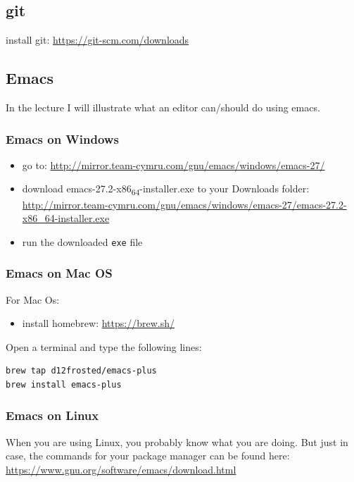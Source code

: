 \documentclass[11pt]{article}
\begin{document}
\subsection{git}
\label{sec:orged07eba}

install git: \url{https://git-scm.com/downloads}

\subsection{Emacs}
\label{sec:org7a8a5fc}

In the lecture I will illustrate what an editor can/should do using emacs.


\subsubsection{Emacs on Windows}
\label{sec:orgc43b2b5}

\begin{itemize}
\item go to: \url{http://mirror.team-cymru.com/gnu/emacs/windows/emacs-27/}
\item download emacs-27.2-x86\textsubscript{64}-installer.exe to your Downloads folder: \url{http://mirror.team-cymru.com/gnu/emacs/windows/emacs-27/emacs-27.2-x86\_64-installer.exe}
\item run the downloaded \texttt{exe} file
\end{itemize}

\subsubsection{Emacs on Mac OS}
\label{sec:org028ce58}

For Mac Os:
\begin{itemize}
\item install homebrew: \url{https://brew.sh/}
\end{itemize}

Open a terminal and type the following lines:

\begin{verbatim}
brew tap d12frosted/emacs-plus
brew install emacs-plus
\end{verbatim}

\subsubsection{Emacs on Linux}
\label{sec:org71c0495}

When you are using Linux, you probably know what you are doing. But just in case, the commands for your package manager can be found here: \url{https://www.gnu.org/software/emacs/download.html}
\end{document}
